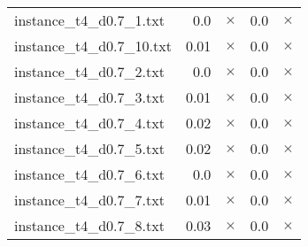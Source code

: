 \documentclass{article}
\begin{document}
\begin{center}
\begin{tabular}{lrrrr}
instance\_t4\_d0.7\_1.txt & 0.0 & 
$\times$
 & 0.0 & 
$\times$
\\
instance\_t4\_d0.7\_10.txt & 0.01 & 
$\times$
 & 0.0 & 
$\times$
\\
instance\_t4\_d0.7\_2.txt & 0.0 & 
$\times$
 & 0.0 & 
$\times$
\\
instance\_t4\_d0.7\_3.txt & 0.01 & 
$\times$
 & 0.0 & 
$\times$
\\
instance\_t4\_d0.7\_4.txt & 0.02 & 
$\times$
 & 0.0 & 
$\times$
\\
instance\_t4\_d0.7\_5.txt & 0.02 & 
$\times$
 & 0.0 & 
$\times$
\\
instance\_t4\_d0.7\_6.txt & 0.0 & 
$\times$
 & 0.0 & 
$\times$
\\
instance\_t4\_d0.7\_7.txt & 0.01 & 
$\times$
 & 0.0 & 
$\times$
\\
instance\_t4\_d0.7\_8.txt & 0.03 & 
$\times$
 & 0.0 & 
$\times$
\\
\hline\end{tabular}
\end{center}
\end{document}
